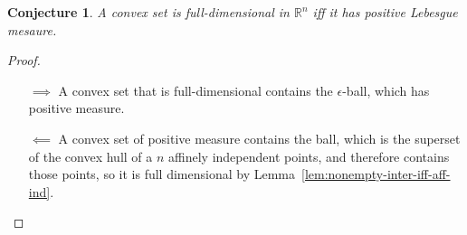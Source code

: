 \documentclass[12pt]{article}
\newcommand{\reals}{\mathbb{R}}
\newtheorem{conjecture}{Conjecture}
\begin{document}
\begin{conjecture}\label{conj:cvx-sets-nonempty-int-iff-pos-measure}
A convex set is full-dimensional in $\reals^n$ iff it has positive Lebesgue mesaure.
\end{conjecture}
\begin{proof}

\begin{enumerate}
\item[$\implies$] A convex set that is full-dimensional contains the $\epsilon$-ball, which has positive measure. 
\item[$\impliedby$] A convex set of positive measure contains the ball, which is the superset of the convex hull of a $n$ affinely independent points, and therefore contains those points, so it is full dimensional by Lemma~\ref{lem:nonempty-inter-iff-aff-ind}.
\end{enumerate}
\end{proof}
\end{document}
